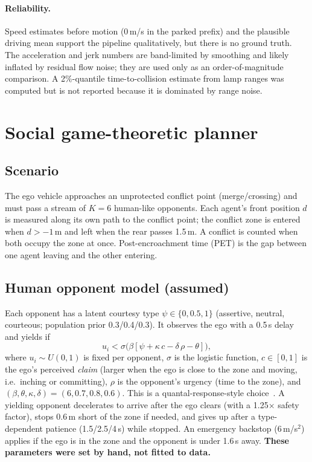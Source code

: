 \documentclass[11pt,a4paper]{article}
\begin{document}
\paragraph{Reliability.} Speed estimates before motion (0\,m/s in the parked prefix) and the plausible driving mean support the pipeline qualitatively, but there is no ground truth. The acceleration and jerk numbers are band-limited by smoothing and likely inflated by residual flow noise; they are used only as an order-of-magnitude comparison. A 2\%-quantile time-to-collision estimate from lamp ranges was computed but is not reported because it is dominated by range noise.

\section{Social game-theoretic planner}
\subsection{Scenario}
The ego vehicle approaches an unprotected conflict point (merge/crossing) and must pass a stream of $K=6$ human-like opponents. Each agent's front position $d$ is measured along its own path to the conflict point; the conflict zone is entered when $d>-1$\,m and left when the rear passes 1.5\,m. A conflict is counted when both occupy the zone at once. Post-encroachment time (PET) is the gap between one agent leaving and the other entering.

\subsection{Human opponent model (assumed)}
Each opponent has a latent courtesy type $\psi\in\{0,0.5,1\}$ (assertive, neutral, courteous; population prior 0.3/0.4/0.3). It observes the ego with a 0.5\,s delay and yields if
\begin{equation}
u_i<\sigma\!\big(\beta[\psi+\kappa\,c-\delta\,\rho-\theta]\big),
\end{equation}
where $u_i\sim U(0,1)$ is fixed per opponent, $\sigma$ is the logistic function, $c\in[0,1]$ is the ego's perceived \emph{claim} (larger when the ego is close to the zone and moving, i.e.\ inching or committing), $\rho$ is the opponent's urgency (time to the zone), and $(\beta,\theta,\kappa,\delta)=(6,0.7,0.8,0.6)$. This is a quantal-response-style choice~\cite{qre}. A yielding opponent decelerates to arrive after the ego clears (with a 1.25$\times$ safety factor), stops 0.6\,m short of the zone if needed, and gives up after a type-dependent patience (1.5/2.5/4\,s) while stopped. An emergency backstop (6\,m/s$^2$) applies if the ego is in the zone and the opponent is under 1.6\,s away. \textbf{These parameters were set by hand, not fitted to data.}
\end{document}
